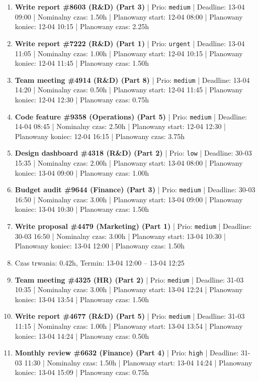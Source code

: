 {\begin{enumerate}
  \item [\textbf{14634}] \textbf{Write report \#8603 (R\&D) (Part 3)} | Prio: \texttt{medium} | Deadline: 13-04 09:00 | Nominalny czas: 1.50h | Planowany start: 12-04 08:00 | Planowany koniec: 12-04 10:15 | Planowany czas: 2.25h
  \item [\textbf{14601}] \textbf{Write report \#7222 (R\&D) (Part 1)} | Prio: \texttt{urgent} | Deadline: 13-04 11:05 | Nominalny czas: 1.00h | Planowany start: 12-04 10:15 | Planowany koniec: 12-04 11:45 | Planowany czas: 1.50h
  \item [\textbf{14638}] \textbf{Team meeting \#4914 (R\&D) (Part 8)} | Prio: \texttt{medium} | Deadline: 13-04 14:20 | Nominalny czas: 0.50h | Planowany start: 12-04 11:45 | Planowany koniec: 12-04 12:30 | Planowany czas: 0.75h
  \item [\textbf{14661}] \textbf{Code feature \#9358 (Operations) (Part 5)} | Prio: \texttt{medium} | Deadline: 14-04 08:45 | Nominalny czas: 2.50h | Planowany start: 12-04 12:30 | Planowany koniec: 12-04 16:15 | Planowany czas: 3.75h
  \item [\textbf{14691}] \textbf{Design dashboard \#4318 (R\&D) (Part 2)} | Prio: \texttt{low} | Deadline: 30-03 15:35 | Nominalny czas: 2.00h | Planowany start: 13-04 08:00 | Planowany koniec: 13-04 09:00 | Planowany czas: 1.00h
  \item [\textbf{14659}] \textbf{Budget audit \#9644 (Finance) (Part 3)} | Prio: \texttt{medium} | Deadline: 30-03 16:50 | Nominalny czas: 3.00h | Planowany start: 13-04 09:00 | Planowany koniec: 13-04 10:30 | Planowany czas: 1.50h
  \item [\textbf{14660}] \textbf{Write proposal \#4479 (Marketing) (Part 1)} | Prio: \texttt{medium} | Deadline: 30-03 16:50 | Nominalny czas: 3.00h | Planowany start: 13-04 10:30 | Planowany koniec: 13-04 12:00 | Planowany czas: 1.50h
  \item [\textbf{PRZERWA}] Czas trwania: 0.42h, Termin: 13-04 12:00 -- 13-04 12:25
  \item [\textbf{14641}] \textbf{Team meeting \#4325 (HR) (Part 2)} | Prio: \texttt{medium} | Deadline: 31-03 10:35 | Nominalny czas: 3.00h | Planowany start: 13-04 12:24 | Planowany koniec: 13-04 13:54 | Planowany czas: 1.50h
  \item [\textbf{14640}] \textbf{Write report \#4677 (R\&D) (Part 5)} | Prio: \texttt{medium} | Deadline: 31-03 11:15 | Nominalny czas: 1.00h | Planowany start: 13-04 13:54 | Planowany koniec: 13-04 14:24 | Planowany czas: 0.50h
  \item [\textbf{14615}] \textbf{Monthly review \#6632 (Finance) (Part 4)} | Prio: \texttt{high} | Deadline: 31-03 11:30 | Nominalny czas: 1.50h | Planowany start: 13-04 14:24 | Planowany koniec: 13-04 15:09 | Planowany czas: 0.75h

\end{enumerate}}
